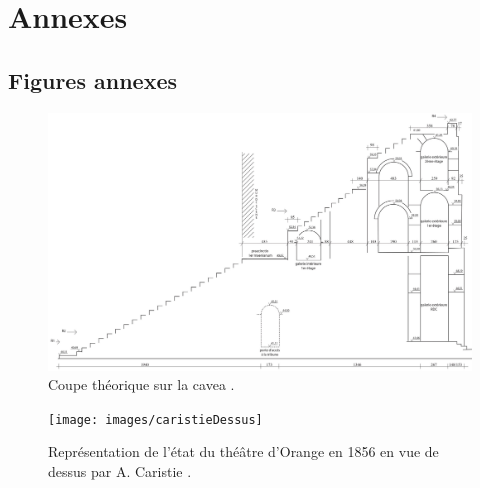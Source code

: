\chapter{Annexes} \label{Annexes}



\section*{Figures annexes}

\begin{figure}[!h]
	\includegraphics[width=\linewidth]{images/CoupeCavea}
	\caption[Coupe théorique sur la \gls{cavea}.]{Coupe théorique sur la \gls{cavea} \cite[Pl. LX]{orangePl}.} 
	\label{coupeCavea} 
\end{figure} 

\begin{figure}[!h]
	\texttt{[image: images/caristieDessus]}
	\caption[Vue de dessus par A. Caristie 1856.]{Représentation de l'état du théâtre d'Orange en 1856 en vue de dessus par A. Caristie \cite[Pl. I]{orangePl}.} 
	\label{caristieDessus} 
\end{figure} 
	
